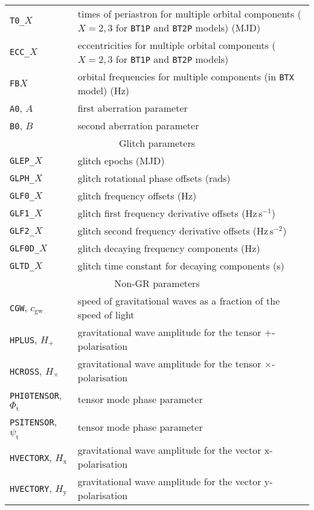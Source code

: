 \begin{longtable}{p{}|p{}}
{\tt T0\_}$X$ & times of periastron for multiple orbital components ($X=2,3$ for {\tt BT1P} and {\tt BT2P} models) (MJD) \\
{\tt ECC\_}$X$ & eccentricities for multiple orbital components ($X=2,3$ for {\tt BT1P} and {\tt BT2P} models) \\
{\tt FB}$X$ & orbital frequencies for multiple components (in {\tt BTX} model) (Hz) \\
{\tt A0}, $A$ & first aberration parameter \citep[see, e.g., Section~2.7.3 of][]{2006MNRAS.372.1549E} \\
{\tt B0}, $B$ & second aberration parameter \citep[se, e.g., Section~2.7.3 of][]{2006MNRAS.372.1549E} \\
\hline
\multicolumn{2}{c}{Glitch parameters \citep[see][]{2006MNRAS.369..655H,2013MNRAS.429..688Y}} \\
\hline
{\tt GLEP\_}$X$ & glitch epochs (MJD) \\
{\tt GLPH\_}$X$ & glitch rotational phase offsets (rads) \\
{\tt GLF0\_}$X$ & glitch frequency offsets (Hz) \\
{\tt GLF1\_}$X$ & glitch first frequency derivative offsets (Hz\,s$^{-1}$) \\
{\tt GLF2\_}$X$ & glitch second  frequency derivative offsets (Hz\,s$^{-2}$) \\
{\tt GLF0D\_}$X$ & glitch decaying frequency components (Hz) \\
{\tt GLTD\_}$X$ & glitch time constant for decaying components (s) \\
\hline
\multicolumn{2}{c}{Non-GR parameters} \\
\hline
{\tt CGW}, $c_{\text{gw}}$ & speed of gravitational waves as a fraction of the speed of light \\
{\tt HPLUS}, $H_+$ &  gravitational wave amplitude for the tensor $+$-polarisation \citep[see, e.g.,][for definitions of this and the subsequent
parameters]{MaxCWpolariations} \\
{\tt HCROSS}, $H_{\times}$ &  gravitational wave amplitude for the tensor $\times$-polarisation \\
{\tt PHI0TENSOR}, $\Phi_{\text{t}}$ & tensor mode phase parameter \\
{\tt PSITENSOR}, $\psi_{\text{t}}$ & tensor mode phase parameter \\
{\tt HVECTORX}, $H_{\text{x}}$ &  gravitational wave amplitude for the vector x-polarisation \\
{\tt HVECTORY}, $H_{\text{y}}$ &  gravitational wave amplitude for the vector y-polarisation \\

\end{longtable}
